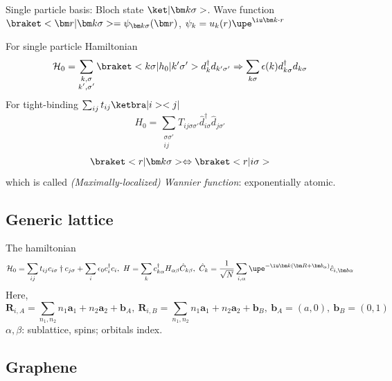 Single particle basis: Bloch state $\ket|\bm k\sigma>$. Wave function $\braket<\bm r|\bm k\sigma> = \psi_{\bm k\sigma}(\bm r)$, $\psi_k = u_k(r)\upe^{\iu\bm k\cdot r}$

For single particle Hamiltonian
\begin{equation}
    \mathcal H_0 =  \sum_{\substack{k,\sigma\\k',\sigma'}}
                      \braket<k\sigma|h_0|k'\sigma'>d_k^\dagger d_{k'\sigma'}
    \Rightarrow \sum_{k\sigma} \epsilon(k) d_{k\sigma}^\dagger d_{k\sigma}
\end{equation}
For tight-binding $\sum_{ij}t_{ij} \ketbra|i><j| $
\begin{equation}
  H_0 = \sum_{\substack{\sigma\sigma'\\ij}}
        T_{ij\sigma\sigma'}\hat d^\dagger_{i\sigma}\hat d_{j\sigma'}
\end{equation}
\begin{equation}
  \braket<r|\bm k\sigma> \Leftrightarrow \braket<r|i\sigma>
\end{equation}
which is called \emph{(Maximally-localized) Wannier function}: exponentially atomic.

\subsection{Generic lattice}

The hamiltonian
\begin{equation}
  \mathcal H_0 = \sum_{ij} t_{ij} c_{i\sigma}\dagger c_{j\sigma} + \sum_i \epsilon_0 c_i^\dagger c_i,~
  H = \sum_k c_{k\alpha}^\dagger H_{\alpha\beta}\hat C_{k\beta},~
  \hat C_k = \frac1{\sqrt N} \sum_{i,\alpha} \upe^{-\iu \bm k (\bm R + \bm b_\alpha)} \hat c_{i, \bm b\alpha}
\end{equation}
Here,
\[
  \bm R_{i,A} = \sum_{n_1,n_2} n_1 \bm a_1 + n_2 \bm a_2 + \bm b_A,~ \bm R_{i,B}
= \sum_{n_1,n_2} n_1 \bm a_1 + n_2\bm a_2 + \bm b_B,~ \bm b_A
= (a,0), ~ \bm b_B = (0,1)
\]
$\alpha,\beta$: sublattice, spins; orbitals index.

\subsection{Graphene}

